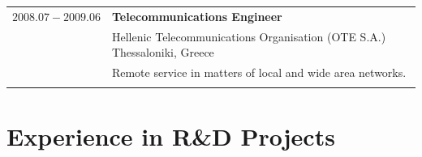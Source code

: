 \documentclass[a4paper,10pt,twoside]{article}
\begin{document}
\begin{tabular}{rp{11cm}}

$2008.07 - 2009.06$ & \textbf{Telecommunications Engineer} \\
  & Hellenic Telecommunications Organisation (OTE S.A.) Thessaloniki, Greece\\
& \small{Remote service in matters of local and wide area networks.
}\\
&\\
\end{tabular}

\vspace*{\fill}
\newpage


\vspace*{\fill}
\section{Experience in R\&D Projects}
\end{document}
